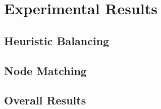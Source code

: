 \chapter{Experimental Results}
\section{Heuristic Balancing}

\section{Node Matching}

\section{Overall Results}